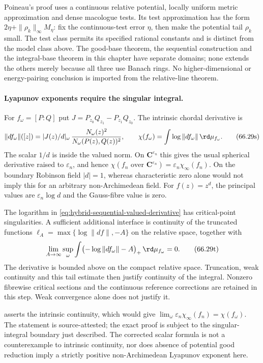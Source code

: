Poineau's proof uses a continuous relative potential, locally uniform
metric approximation and dense macologue tests. Its test approximation
has the form $2\eta+\|\rho_k\|_\infty M_\eta$: fix the continuous-test
error $\eta$, then make the potential tail $\rho_k$ small. The test
class permits its specified rational constants and is distinct from
the model class above. The good-base theorem, the sequential
construction and the integral-base theorem in this chapter have
separate domains; none extends the others merely because all three
use Banach rings. No higher-dimensional or energy-pairing conclusion
is imported from the relative-line theorem.

\paragraph{Lyapunov exponents require the singular integral.}
For $f_\omega=[P:Q]$ put
$J=P_{z_0}Q_{z_1}-P_{z_1}Q_{z_0}$. The intrinsic chordal derivative is
\[
 \|df_\omega\|([z])=
       |J(z)/d|_\omega\,
       \frac{N_\omega(z)^2}{N_\omega(P(z),Q(z))^2},
 \qquad
 \chi(f_\omega)=\int\log\|df_\omega\|\,\rd\mu_{f_\omega}.
\tag{66.29s}\label{eq:hybrid-sequential-valued-derivative}
\]
The scalar $1/d$ is inside the valued norm. On
$\mathbf C^{\varepsilon_n}$ this gives the usual spherical derivative
raised to $\varepsilon_n$, and hence
$\chi(f_n\text{ over }\mathbf C^{\varepsilon_n})
=\varepsilon_n\chi_\infty(f_n)$.
On the boundary Robinson field $|d|=1$, whereas characteristic zero
alone would not imply this for an arbitrary non-Archimedean field.
For $f(z)=z^d$, the principal values are $\varepsilon_n\log d$
and the Gauss-fibre value is zero.

The logarithm in \eqref{eq:hybrid-sequential-valued-derivative}
has critical-point singularities. A sufficient additional interface
is continuity of the truncated functions
$\ell_A=\max\{\log\|df\|,-A\}$ on the relative space, together with
\[
 \lim_{A\to\infty}\sup_\omega
       \int\bigl(-\log\|df_\omega\|-A\bigr)_+
                                         \,\rd\mu_{f_\omega}=0.
\tag{66.29t}\label{eq:hybrid-sequential-critical-uniform-integrability}
\]
The derivative is bounded above on the compact relative space.
Truncation, weak continuity and this tail estimate then justify
continuity of the integral. Nonzero fibrewise critical sections and
the continuous reference corrections are retained in this step.
Weak convergence alone does not justify it.

\cite[Corollary~5.9]{FavreGong26SequentialV4} asserts the intrinsic
continuity, which would give
$\lim_\omega\varepsilon_n\chi_\infty(f_n)=\chi(f_\omega)$.
The statement is source-attested; the exact proof is subject to the
singular-integral boundary just described. The corrected scalar
formula is not a counterexample to intrinsic continuity, nor does
absence of potential good reduction imply a strictly positive
non-Archimedean Lyapunov exponent here.

